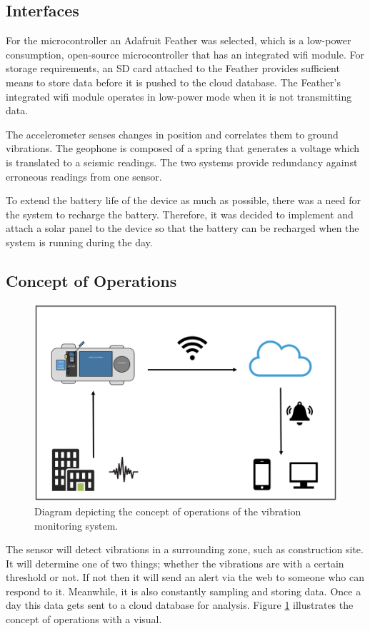 \documentclass[12pt]{article}
\begin{document}
\subsection{Interfaces}
For the microcontroller an Adafruit Feather was selected, which is a low-power consumption, open-source microcontroller that has an integrated wifi module. For storage requirements, an SD card attached to the Feather provides sufficient means to store data before it is pushed to the cloud database.
The Feather's integrated wifi module operates in low-power mode when it is not transmitting data.

The accelerometer senses changes in position and correlates them to ground vibrations. The geophone is composed of a spring that generates a voltage which is translated to a seismic readings. The two systems provide redundancy against erroneous readings from one sensor.

To extend the battery life of the device as much as possible, there was a need for the system to recharge the battery. Therefore, it was decided to implement and attach a solar panel to the device so that the battery can be recharged when the system is running during the day.

\subsection{Concept of Operations}
\begin{figure}[H]
    \centering
    \includegraphics[width=.7\textwidth]{src/concept_of_operations.png}
    \caption{Diagram depicting the concept of operations of the vibration monitoring system.}
    \label{fig:concept_of_operations}
\end{figure}

The sensor will detect vibrations in a surrounding zone, such as construction site. It will determine one of two things; whether the vibrations are with a certain threshold or not. If not then it will send an alert via the web to someone who can respond to it. Meanwhile, it is also  constantly sampling and storing data. Once a day this data gets sent to a cloud database for analysis. Figure \ref{fig:concept_of_operations} illustrates the concept of operations with a visual.
\end{document}
